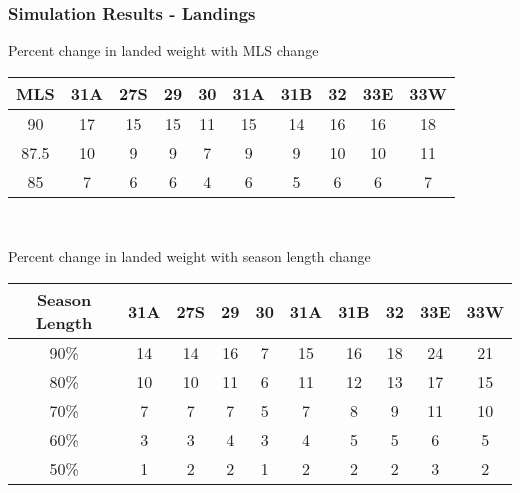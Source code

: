 \documentclass{beamer}
\begin{document}
\begin{frame}
\frametitle{Simulation Results - Landings}
Percent change in  landed weight  with MLS change 
\centering
\begin{tabular}{|c|c|c|c|c|c|c|c|c|c|}
\hline
MLS & 31A & 27S & 29 & 30 & 31A & 31B & 32 & 33E & 33W \\
\hline
90 & 17 & 15 & 15 & 11 & 15 & 14 & 16 & 16 & 18 \\
\hline
87.5 & 10 & 9  & 9  & 7  & 9  & 9  & 10 & 10 & 11 \\
\hline
85 & 7  & 6  & 6  & 4  & 6  & 5  & 6  & 6 & 7 \\
\hline
 
\end{tabular}\\
\vspace{5mm}

Percent change in  landed weight with season length change 
\centering
\begin{tabular}{|c|c|c|c|c|c|c|c|c|c|}
\hline
Season Length & 31A & 27S & 29 & 30 & 31A & 31B & 32 & 33E & 33W \\
\hline
90\% & 14 & 14 & 16 & 7 & 15 & 16 & 18 & 24 & 21 \\
\hline
80\% & 10 & 10 & 11 & 6 & 11 & 12 & 13 & 17 & 15 \\
\hline
70\% & 7  & 7  & 7  & 5 & 7  & 8  & 9  & 11 & 10 \\
\hline
60\% & 3  & 3  & 4  & 3 & 4  & 5  & 5  & 6  & 5  \\
\hline
50\% & 1  & 2  & 2  & 1 & 2  & 2  & 2  & 3  & 2  \\
\hline
 
\end{tabular}
\end{frame}
 
\end{document}
